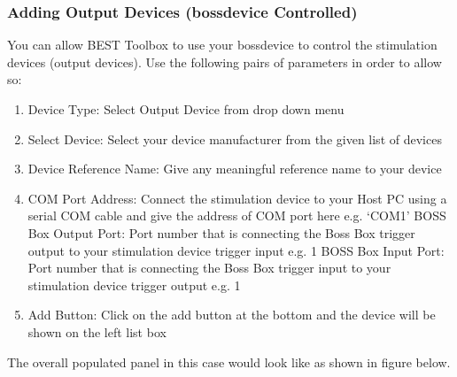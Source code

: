 \documentclass[letterpaper,10pt,english]{sphinxmanual}
\begin{document}
\subsubsection{Adding Output Devices (bossdevice Controlled)}
\label{\detokenize{5_HardwareConfiguration:adding-output-devices-bossdevice-controlled}}
\sphinxAtStartPar
You can allow BEST Toolbox to use your bossdevice to control the stimulation devices (output devices). Use the following pairs of parameters in order to allow so:
\begin{enumerate}
%
\item {} 
\sphinxAtStartPar
Device Type: Select Output Device from drop down menu

\item {} 
\sphinxAtStartPar
Select Device: Select your device manufacturer from the given list of devices

\item {} 
\sphinxAtStartPar
Device Reference Name: Give any meaningful reference name to your device

\item {} 
\sphinxAtStartPar
COM Port Address: Connect the stimulation device to your Host PC using a serial COM cable and give the address of COM port here e.g. ‘COM1’ BOSS Box Output Port: Port number that is connecting the Boss Box trigger output to your stimulation device trigger input e.g. 1 BOSS Box Input Port: Port number that is connecting the Boss Box trigger input to your stimulation device trigger output e.g. 1

\item {} 
\sphinxAtStartPar
Add Button: Click on the add button at the bottom and the device will be shown on the left list box

\end{enumerate}

\sphinxAtStartPar
The overall populated panel in this case would look like as shown in figure below.
\end{document}
